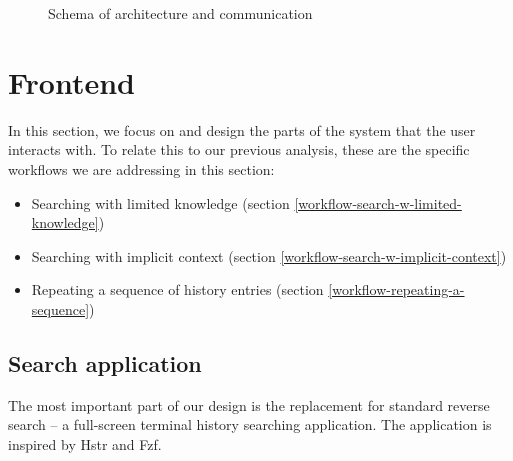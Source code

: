 \begin{figure}[h!]
\centering
{}
\caption{Schema of architecture and communication}
\label{design-architecture-layers}
\end{figure}

\newpage
\section{Frontend}\label{design-frontend}

In this section, we focus on and design the parts of the system that the user interacts with. 
To relate this to our previous analysis, these are the specific workflows we are addressing in this section:

\begin{itemize}
\item Searching with limited knowledge (section \ref{workflow-search-w-limited-knowledge})
\item Searching with implicit context (section \ref{workflow-search-w-implicit-context})
\item Repeating a sequence of history entries (section \ref{workflow-repeating-a-sequence})
\end{itemize}

\subsection{Search application}

The most important part of our design is the replacement for standard reverse search -- a full-screen terminal history searching application. The application is inspired by Hstr and Fzf. 

